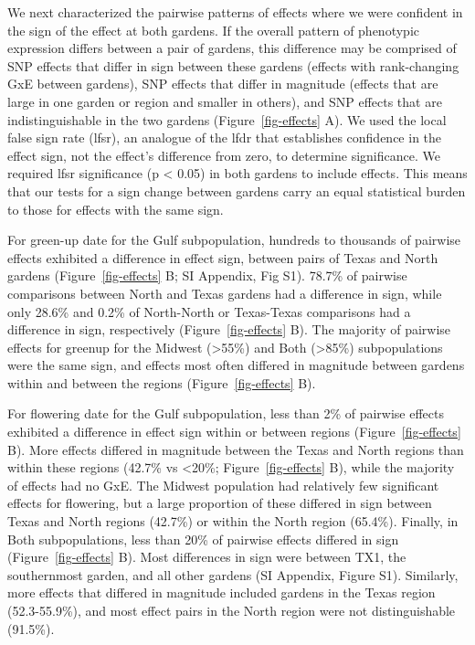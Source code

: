 \documentclass[
  9pt,
  twocolumn,
  twoside]{pnas-new}
\begin{document}
We next characterized the pairwise patterns of effects where we were
confident in the sign of the effect at both gardens. If the overall
pattern of phenotypic expression differs between a pair of gardens, this
difference may be comprised of SNP effects that differ in sign between
these gardens (effects with rank-changing GxE between gardens), SNP
effects that differ in magnitude (effects that are large in one garden
or region and smaller in others), and SNP effects that are
indistinguishable in the two gardens (Figure~\ref{fig-effects} A). We
used the local false sign rate (lfsr), an analogue of the lfdr that
establishes confidence in the effect sign, not the effect's difference
from zero, to determine significance. We required lfsr significance (p
\textless{} 0.05) in both gardens to include effects. This means that
our tests for a sign change between gardens carry an equal statistical
burden to those for effects with the same sign.

For green-up date for the Gulf subpopulation, hundreds to thousands of
pairwise effects exhibited a difference in effect sign, between pairs of
Texas and North gardens (Figure~\ref{fig-effects} B; SI Appendix, Fig
S1). 78.7\% of pairwise comparisons between North and Texas gardens had
a difference in sign, while only 28.6\% and 0.2\% of North-North or
Texas-Texas comparisons had a difference in sign, respectively
(Figure~\ref{fig-effects} B). The majority of pairwise effects for
greenup for the Midwest (\textgreater55\%) and Both (\textgreater85\%)
subpopulations were the same sign, and effects most often differed in
magnitude between gardens within and between the regions
(Figure~\ref{fig-effects} B).

For flowering date for the Gulf subpopulation, less than 2\% of pairwise
effects exhibited a difference in effect sign within or between regions
(Figure~\ref{fig-effects} B). More effects differed in magnitude between
the Texas and North regions than within these regions (42.7\% vs
\textless20\%; Figure~\ref{fig-effects} B), while the majority of
effects had no GxE. The Midwest population had relatively few
significant effects for flowering, but a large proportion of these
differed in sign between Texas and North regions (42.7\%) or within the
North region (65.4\%). Finally, in Both subpopulations, less than 20\%
of pairwise effects differed in sign (Figure~\ref{fig-effects} B). Most
differences in sign were between TX1, the southernmost garden, and all
other gardens (SI Appendix, Figure S1). Similarly, more effects that
differed in magnitude included gardens in the Texas region
(52.3-55.9\%), and most effect pairs in the North region were not
distinguishable (91.5\%).
\end{document}
